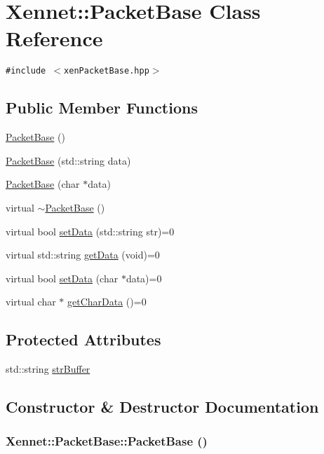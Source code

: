 \hypertarget{classXennet_1_1PacketBase}{
\section{Xennet::PacketBase Class Reference}
\label{classXennet_1_1PacketBase}
}
{\tt \#include $<$xenPacketBase.hpp$>$}

\subsection*{Public Member Functions}
\begin{CompactItemize}
\item 
\hyperlink{classXennet_1_1PacketBase_469d592ab4214407c83bb12e0a3b7fb5}{PacketBase} ()
\item 
\hyperlink{classXennet_1_1PacketBase_2620be36e870d26091addfb1686687d1}{PacketBase} (std::string data)
\item 
\hyperlink{classXennet_1_1PacketBase_7205e2e9af5f535c9395ce176dc6c0dd}{PacketBase} (char $\ast$data)
\item 
virtual \hyperlink{classXennet_1_1PacketBase_d3fe1078f7de6c8c2b6fdb121bce870b}{$\sim$PacketBase} ()
\item 
virtual bool \hyperlink{classXennet_1_1PacketBase_eb1c97c2b02b35899ab9ac23d034a619}{setData} (std::string str)=0
\item 
virtual std::string \hyperlink{classXennet_1_1PacketBase_01c2e74a25df5fcf0e287c97b9a766c2}{getData} (void)=0
\item 
virtual bool \hyperlink{classXennet_1_1PacketBase_c2108b4190c783012d9771fab0c6d856}{setData} (char $\ast$data)=0
\item 
virtual char $\ast$ \hyperlink{classXennet_1_1PacketBase_63902a287597beab0a918b0643b35dc6}{getCharData} ()=0
\end{CompactItemize}
\subsection*{Protected Attributes}
\begin{CompactItemize}
\item 
std::string \hyperlink{classXennet_1_1PacketBase_e9a2adcaac12840f617f23de231519d3}{strBuffer}
\end{CompactItemize}


\subsection{Constructor \& Destructor Documentation}
\hypertarget{classXennet_1_1PacketBase_469d592ab4214407c83bb12e0a3b7fb5}{
\subsubsection{\setlength{\rightskip}{0pt plus 5cm}Xennet::PacketBase::PacketBase ()}}
\label{classXennet_1_1PacketBase_469d592ab4214407c83bb12e0a3b7fb5}



